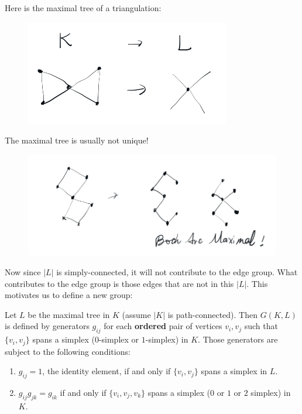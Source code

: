 \begin{ex}
    Here is the maximal tree of a triangulation:
    \begin{figure}[H]
        \centering
        \includegraphics[width=0.6\linewidth]{pics/ch6-notes-3/ex1-maximal-tree.png}
    \end{figure}
\end{ex}

\begin{ex}
    The maximal tree is usually not unique!
    \begin{figure}[H]
        \centering
        \includegraphics[width=0.9\linewidth]{pics/ch6-notes-3/ex2-maxi-tree-not-unique.png}
    \end{figure}
\end{ex}


Now since $|L|$ is simply-connected, it will not contribute to the
edge group. What contributes to the edge group is those edges that are
not in this $|L|$. This motivates us to define a new group:

\begin{defi}[$G(K,L)$]
    Let $L$ be the maximal tree in $K$ (assume $|K|$ is
    path-connected). Then $G(K,L)$ is defined by generators $g_{ij}$
    for each \textbf{ordered} pair of vertices $v_i,v_j$ such that
    $\{v_i,v_j\}$ spans a simplex ($0$-simplex or $1$-simplex) in $K$.
    Those generators are subject to the following conditions:
    \begin{enumerate}
        \item $g_{ij}=1$, the identity element, if and only if
            $\{v_i,v_j\}$ spans a simplex in $L$.
        \item $g_{ij}g_{jk}=g_{ik}$ if and only if $\{v_i,v_j,v_k\}$
            spans a simplex ($0$ or $1$ or $2$ simplex) in $K$.
    \end{enumerate}
\end{defi}


